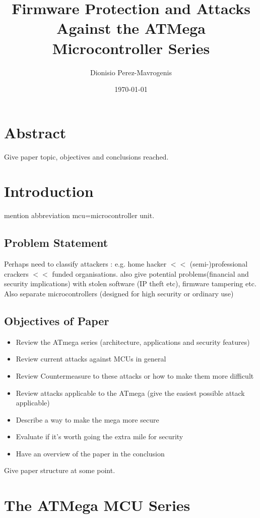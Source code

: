 \documentclass[12pt,a4paper,twocolumn]{article}
\author{Dionisio Perez-Mavrogenis}
\title{Firmware Protection and Attacks Against the ATMega Microcontroller Series}
\date{\today}
\begin{document}
	\maketitle
	
	\section*{Abstract}
	Give paper topic, objectives and conclusions reached.
	
	\section{Introduction}
	mention abbreviation mcu=microcontroller unit. 
	\subsection{Problem Statement}
	Perhaps need to classify attackers : e.g. home hacker $<<$ (semi-)professional crackers $<<$ funded organisations. also give potential problems(financial and security implications) with stolen software (IP theft etc), firmware tampering etc. Also separate microcontrollers (designed for high security or ordinary use)

	\subsection{Objectives of Paper}
	\begin{itemize}
	\item Review the ATmega series (architecture, applications and security features)\\
	\item Review current attacks against MCUs in general \\
	\item Review Countermeasure to these attacks or how to make them more difficult
	\item Review attacks applicable to the ATmega (give the easiest possible attack applicable)
	\item Describe a way to make the mega more secure
	\item Evaluate if it's worth going the extra mile for security
	\item Have an overview of the paper in the conclusion
	\end{itemize}
	
	Give paper structure at some point.
	
	\section{The ATMega MCU Series}
\end{document}

